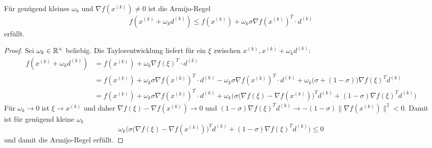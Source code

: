 \documentclass[
]{mycourse}
\begin{document}
\begin{lem} \label{4.7}
	Für genügend kleines $\omega_k$ und $\nabla f(x^{(k)}) \neq 0$ ist die Armijo-Regel
	\[
		f(x^{(k)} + \omega_k d^{(k)}) \le f(x^{(k)}) + \omega_k \sigma \nabla f(x^{(k)})^T \cdot d^{(k)}
	\]
	erfüllt.
	\begin{proof}
		Sei $\omega_k \in \mathbb{R}^+$ beliebig.
		Die Taylorentwicklung liefert für ein $\xi$ zwischen $x^{(k)}, x^{(k)} + \omega_k d^{(k)}$:
		\begin{align*}
			f(x^{(k)}+ \omega_k d^{(k)}) &= f(x^{(k)}) + \omega_k \nabla f(\xi)^T \cdot d^{(k)} \\
			&= f(x^{(k)}) + \omega_k \sigma \nabla f(x^{(k)})^T \cdot d^{(k)} - \omega_k \sigma \nabla f(x^{(k)})^T \cdot d^{(k)} + \omega_k \Big(\sigma + (1- \sigma)\Big) \nabla f(\xi)^T d^{(k)}\\
			&= f(x^{(k)}) + \omega_k \sigma \nabla f(x^{(k)})^T \cdot d^{(k)}
			+ \omega_k \bigg(\sigma \Big(\nabla f(\xi) - \nabla f(x^{(k)})\Big)^T d^{(k)} + (1-\sigma)\nabla f(\xi)^T d^{(k)} \bigg)
		\end{align*}
		Für $\omega_k \to 0$ ist $\xi \to x^{(k)}$ und daher $\nabla f(\xi) - \nabla f(x^{(k)}) \to 0$ und $(1-\sigma) \nabla f(\xi)^T d^{(k)} \to -(1-\sigma)\|\nabla f(x^{(k)})\|^2 < 0$.
		Damit ist für genügend kleine $\omega_k$
		\[
			\omega_k \bigg(\sigma \Big(\nabla f(\xi) - \nabla f(x^{(k)})\Big)^T d^{(k)} + (1-\sigma)\nabla f(\xi)^T d^{(k)} \bigg) \le 0
		\]
		und damit die Armijo-Regel erfüllt.
	\end{proof}
\end{lem}
\end{document}
